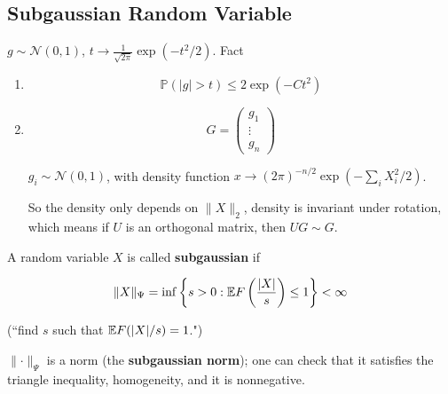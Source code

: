 \subsection{Subgaussian Random Variable}

\(g \sim \mathcal{N}(0,1)\), \(t \to \frac{1}{\sqrt{2 \pi}} \exp(-t^2/2)\). Fact

\begin{enumerate}

\item \[
\mathbb{P}(|g| > t) \leq 2 \exp(-Ct^2)
\]


\item

\[
G = \begin{pmatrix}g_1 \\
\vdots \\
g_n \end{pmatrix} 
\]

\(g_i \sim \mathcal{N}(0,1)\), with density function \(x \to (2\pi)^{-n/2} \exp \left (- \sum_i X_i^2 /2 \right)\).

So the density only depends on \(\lVert X \rVert_2\), density is invariant under rotation, which means if \(U\) is an orthogonal matrix, then \(UG \sim G\). 
\end{enumerate}

\begin{definition} A random variable \(X\) is called \textbf{subgaussian} if 

\[
\lVert X \rVert_{\Psi} = \inf \left\{ s >0: \mathbb{E} F \left(\frac{|X|}{s} \right) \leq 1 \right\} < \infty
\]

(``find \(s\) such that \(\mathbb{E} F(|X|/s) = 1\).")

\end{definition}

\begin{remark}
\(\lVert \cdot \rVert_{\Psi} \) is a norm (the \textbf{subgaussian norm}); one can check that it satisfies the triangle inequality, homogeneity, and it is nonnegative. 
\end{remark}

